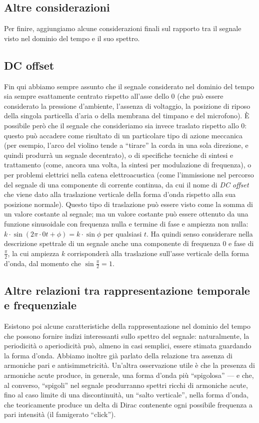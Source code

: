 \subsection{Altre considerazioni}

Per finire, aggiungiamo alcune considerazioni finali sul rapporto tra il segnale visto nel dominio del tempo e il suo spettro.


\subsection{DC offset}

Fin qui abbiamo sempre assunto che il segnale considerato nel dominio del tempo sia sempre esattamente centrato rispetto all'asse dello 0 (che può essere considerato la pressione d'ambiente, l'assenza di voltaggio, la posizione di riposo della singola particella d'aria o della membrana del timpano e del microfono). È possibile però che il segnale che consideriamo sia invece traslato rispetto allo 0: questo può accadere come risultato di un particolare tipo di azione meccanica (per esempio, l'arco del violino tende a ``tirare'' la corda in una sola direzione, e quindi produrrà un segnale decentrato), o di specifiche tecniche di sintesi e trattamento (come, ancora una volta, la sintesi per modulazione di frequenza), o per problemi elettrici nella catena elettroacustica (come l'immissione nel percorso del segnale di una componente di corrente continua, da cui il nome di \emph{DC offset} che viene dato alla traslazione verticale della forma d'onda rispetto alla sua posizione normale). Questo tipo di traslazione può essere visto come la somma di un valore costante al segnale; ma un valore costante può essere ottenuto da una funzione sinusoidale con frequenza nulla e termine di fase e ampiezza non nulla: $k \cdot \sin(2\pi \cdot 0t + \phi ) = k \cdot \sin \phi $ per qualsiasi $t$. Ha quindi senso considerare nella descrizione spettrale di un segnale anche una componente di frequenza 0 e fase di $\frac{\pi}{2}$, la cui ampiezza $k$ corrisponderà alla traslazione sull'asse verticale della forma d'onda, dal momento che $\sin \frac{\pi}{2} = 1$.


\subsection{Altre relazioni tra rappresentazione temporale e frequenziale}

Esistono poi alcune caratteristiche della rappresentazione nel dominio del tempo che possono fornire indizi interessanti sullo spettro del segnale: naturalmente, la periodicità o aperiodicità può, almeno in casi semplici, essere stimata guardando la forma d'onda. Abbiamo inoltre già parlato della relazione tra assenza di armoniche pari e antisimmetricità. Un'altra osservazione utile è che la presenza di armoniche acute produce, in generale, una forma d'onda più ``spigolosa'' --- e che, al converso, ``spigoli'' nel segnale produrranno spettri ricchi di armoniche acute, fino al caso limite di una discontinuità, un  ``salto verticale'', nella forma d'onda, che teoricamente produce un delta di Dirac contenente ogni possibile frequenza a pari intensità (il famigerato ``click'').


